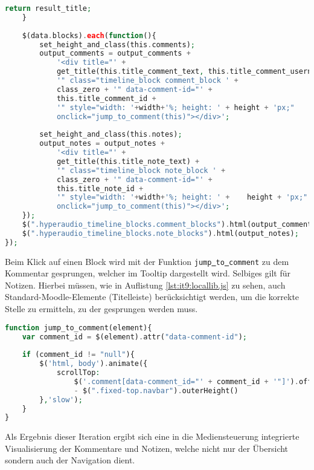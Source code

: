 \begin{lstlisting}[language=php,
             linewidth=\textwidth,
             caption={Ausschnitt der \textbf{hyperaudio.js} in der 9. Iteration},
             label={lst:it9:hyperaudio}]
        return result_title;
    }
		    	
    $(data.blocks).each(function(){
        set_height_and_class(this.comments);
        output_comments = output_comments + 
            '<div title="' + 
            get_title(this.title_comment_text, this.title_comment_username) +
            '" class="timeline_block comment_block ' + 
            class_zero + '" data-comment-id="' + 
            this.title_comment_id + 
            '" style="width: '+width+'%; height: ' + height + 'px;"
            onclick="jump_to_comment(this)"></div>';
                
        set_height_and_class(this.notes);
        output_notes = output_notes +
            '<div title="' +
            get_title(this.title_note_text) + 
            '" class="timeline_block note_block ' +
            class_zero + '" data-comment-id="' +
            this.title_note_id + 
            '" style="width: '+width+'%; height: ' +	height + 'px;"
            onclick="jump_to_comment(this)"></div>';
    });
    $(".hyperaudio_timeline_blocks.comment_blocks").html(output_comments);
    $(".hyperaudio_timeline_blocks.note_blocks").html(output_notes);
});
\end{lstlisting}
Beim Klick auf einen Block wird mit der Funktion \texttt{jump\underline{{ }}to\underline{{ }}comment} zu dem Kommentar gesprungen, welcher im Tooltip dargestellt wird. Selbiges gilt für Notizen. Hierbei müssen, wie in Auflistung \ref{lst:it9:locallib.js} zu sehen, auch Standard-Moodle-Elemente (Titelleiste) berücksichtigt werden, um die korrekte Stelle zu ermitteln, zu der gesprungen werden muss.

\begin{lstlisting}[language=php,
             linewidth=\textwidth,
             caption={Ausschnitt der \textbf{locallib.js} in der 9. Iteration},
             label={lst:it9:locallib.js}]
function jump_to_comment(element){
    var comment_id = $(element).attr("data-comment-id");
	
    if (comment_id != "null"){
        $('html, body').animate({
            scrollTop:
                $('.comment[data-comment_id="' + comment_id + '"]').offset().top
                - $(".fixed-top.navbar").outerHeight()
        },'slow');
    }
}
\end{lstlisting}
Als Ergebnis dieser Iteration ergibt sich eine in die Mediensteuerung integrierte Visualisierung der Kommentare und Notizen, welche nicht nur der Übersicht sondern auch der Navigation dient.

